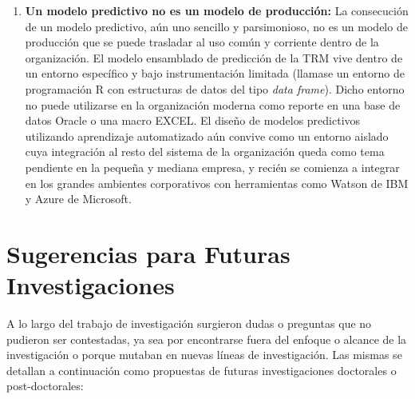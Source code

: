 \begin{enumerate}
    \item \textbf{Un modelo predictivo no es un modelo de producción:} La consecución de un modelo predictivo, aún uno sencillo y parsimonioso, no es un modelo de producción que se puede trasladar al uso común y corriente dentro de la organización. El modelo ensamblado de predicción de la TRM vive dentro de un entorno específico y bajo instrumentación limitada (llamase un entorno de programación R con estructuras de datos del tipo \emph{data frame}). Dicho entorno no puede utilizarse en la organización moderna como reporte en una base de datos Oracle o una macro EXCEL. El diseño de modelos predictivos utilizando aprendizaje automatizado aún convive como un entorno aislado cuya integración al resto del sistema de la organización queda como tema pendiente en la pequeña y mediana empresa, y recién se comienza a integrar en los grandes ambientes corporativos con herramientas como Watson de IBM y Azure de Microsoft. 
\end{enumerate}

\section{Sugerencias para Futuras Investigaciones}
A lo largo del trabajo de investigación surgieron dudas o preguntas que no pudieron ser contestadas, ya sea por encontrarse fuera del enfoque o alcance de la investigación o porque mutaban en nuevas líneas de investigación. Las mismas se detallan a continuación como propuestas de futuras investigaciones doctorales o post-doctorales:

